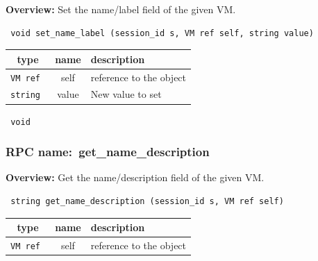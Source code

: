{\bf Overview:} 
Set the name/label field of the given VM.

\begin{verbatim} void set_name_label (session_id s, VM ref self, string value)\end{verbatim}



 
\vspace{0.3cm}
\begin{tabular}{|c|c|p{7cm}|}
 \hline
{\bf type} & {\bf name} & {\bf description} \\ \hline
{\tt VM ref } & self & reference to the object \\ \hline 

{\tt string } & value & New value to set \\ \hline 

\end{tabular}

\vspace{0.3cm}

{\tt 
void
}



\vspace{0.3cm}
\vspace{0.3cm}
\vspace{0.3cm}
\subsubsection{RPC name:~get\_name\_description}

{\bf Overview:} 
Get the name/description field of the given VM.

\begin{verbatim} string get_name_description (session_id s, VM ref self)\end{verbatim}



 
\vspace{0.3cm}
\begin{tabular}{|c|c|p{7cm}|}
 \hline
{\bf type} & {\bf name} & {\bf description} \\ \hline
{\tt VM ref } & self & reference to the object \\ \hline 

\end{tabular}

\vspace{0.3cm}

